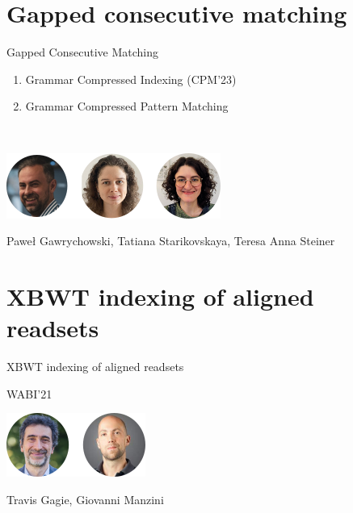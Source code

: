 \appendix
\backupbegin

\section{Gapped consecutive matching}

\begin{frame}
  \centering
  {\Large Gapped Consecutive Matching}

  \bigskip
  \begin{minipage}{0.55\textwidth}  
    \begin{enumerate}
      \item Grammar Compressed Indexing (CPM'23)
      \item Grammar Compressed Pattern Matching
    \end{enumerate}
  \end{minipage}\\
  \bigskip
  
  \includegraphics{pictures/mindmap/gapped.png}

  \bigskip
  Paweł Gawrychowski, Tatiana Starikovskaya, Teresa Anna Steiner
\end{frame}


%




\section{XBWT indexing of aligned readsets}
\begin{frame}
  \centering
  {\Large XBWT indexing of aligned readsets}
    
  \medskip
  {\large WABI'21}
  \bigskip

  \includegraphics{pictures/mindmap/xbwt.png}

  \bigskip
  Travis Gagie, Giovanni Manzini
\end{frame}

%

\backupend